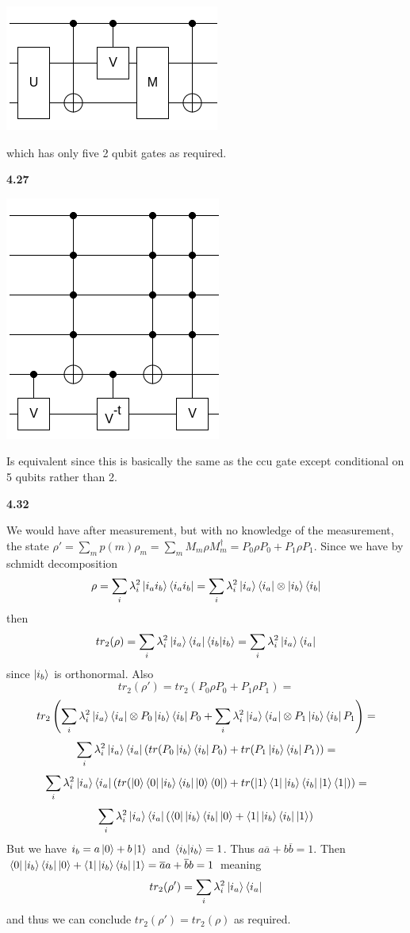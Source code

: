 \includegraphics[scale = 0.5]{images/4.25.7.png}

which has only five 2 qubit gates as required.

\textbf{4.27}

\includegraphics[scale = 0.5]{images/4.27.png}

Is equivalent since this is basically the same as the ccu gate except conditional on 5 qubits rather than 2.

\textbf{4.32}

We would have after measurement, but with no knowledge of the measurement, the state $ \rho' =  \sum_m p(m)\rho_m = \sum_m M_m \rho M_m^\dag = P_0\rho P_0 + P_1 \rho P_1$. Since we have by schmidt decomposition \[\rho = \sum_{i} \lambda_i^2\ket{i_ai_b}\bra{i_ai_b} =\sum_{i} \lambda_i^2\ket{i_a}\bra{i_a}\otimes \ket{i_b}\bra{i_b}\] then \[tr_2(\rho) = \sum_i\lambda_i^2\ket{i_a}\bra{i_a}\braket{i_b|i_b} = \sum_i\lambda_i^2\ket{i_a}\bra{i_a}\]since $\ket{i_b}$ is orthonormal. Also \[tr_2(\rho') = tr_2(P_0\rho P_0 + P_1\rho P_1) =\] \[tr_2\left(\sum_{i} \lambda_i^2\ket{i_a}\bra{i_a}\otimes P_0\ket{i_b}\bra{i_b}P_0 + \sum_{i} \lambda_i^2\ket{i_a}\bra{i_a}\otimes P_1\ket{i_b}\bra{i_b}P_1\right) = \]
\[\sum_i\lambda_i^2\ket{i_a}\bra{i_a}(tr(P_0\ket{i_b}\bra{i_b}P_0) + tr(P_1\ket{i_b}\bra{i_b}P_1)) =  \]
\[\sum_i\lambda_i^2\ket{i_a}\bra{i_a}(tr(\ket{0}\bra{0}\ket{i_b}\bra{i_b}\ket{0}\bra{0}) + tr(\ket{1}\bra{1}\ket{i_b}\bra{i_b}\ket{1}\bra{1})) = \]
\[\sum_i\lambda_i^2\ket{i_a}\bra{i_a}(\bra{0}\ket{i_b}\bra{i_b}\ket{0} + \bra{1}\ket{i_b}\bra{i_b}\ket{1})\] But we have $i_b = a\ket{0} + b\ket{1}$ and $\braket{i_b | i_b} = 1$. Thus $a\overline{a} + b\overline{b} = 1$. Then $\bra{0}\ket{i_b}\bra{i_b}\ket{0} + \bra{1}\ket{i_b}\bra{i_b}\ket{1} = \overline{a}a + \overline{b}b  = 1$ meaning 
\[tr_2(\rho') = \sum_i\lambda_i^2\ket{i_a}\bra{i_a}\] and thus we can conclude $tr_2(\rho') = tr_2(\rho)$ as required.

